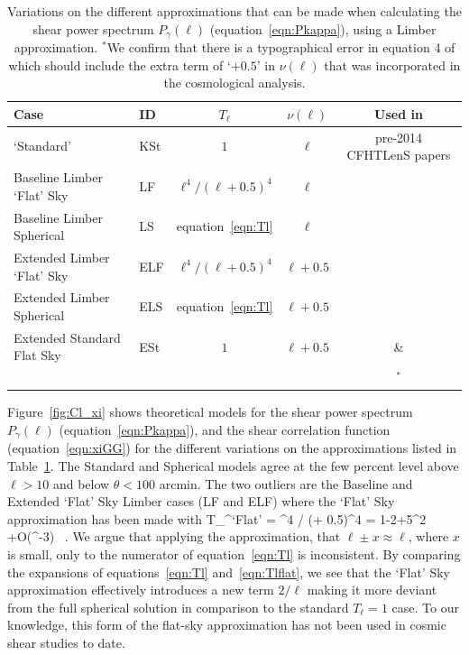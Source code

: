 \begin{table}[htb]
\begin{center}
\begin{tabular}{ | l | l | c | c  | c |}
\hline
Case & ID & $T_\ell$ & $\nu(\ell)$ & Used in \\ \hline
\citet{kitching/etal:2016} `Standard' & KSt & $1$ & $\ell$ & pre-2014 CFHTLenS papers \\
Baseline Limber `Flat' Sky &  LF & $\ell^4 / (\ell + 0.5)^4$ & $\ell$ & \\
Baseline Limber Spherical & LS & equation~\ref{eqn:Tl} & $\ell$ & \\
Extended Limber `Flat' Sky & ELF & $\ell^4 / (\ell + 0.5)^4$ & $\ell + 0.5$ & \\
Extended Limber Spherical & ELS & equation~\ref{eqn:Tl}& $\ell + 0.5$  & \\
Extended Standard Flat Sky & ESt & $1$ & $\ell + 0.5$ & \citet{joudaki/etal:2016} \&  \\
  &  & & & \citet{hildebrandt/etal:2016}$^*$\\\hline
 \end{tabular}
 \end{center}
 \caption{\label{tab:Tl_nu}Variations on the different approximations that can be made when calculating the shear power spectrum $P_\gamma(\ell)$ (equation~\ref{eqn:Pkappa}), using a Limber approximation.  $^*$We confirm that there is a typographical error in equation 4 of \citet{hildebrandt/etal:2016} which should include the extra term of `$+0.5$' in $\nu(\ell)$ that was incorporated in the cosmological analysis.} 
 \end{table}

Figure~\ref{fig:Cl_xi} shows theoretical models for the shear power spectrum $P_\gamma(\ell)$ (equation~\ref{eqn:Pkappa}), and the shear correlation function (equation~\ref{eqn:xiGG}) for the different variations on the approximations listed in Table~\ref{tab:Tl_nu}.   The Standard and Spherical models agree at the few percent level above $\ell>10$ and below $\theta< 100$ arcmin.  The two outliers are the Baseline and Extended `Flat' Sky Limber cases (LF and ELF) where the \citet{kitching/etal:2016} `Flat' Sky approximation has been made with
\be
T_\ell^{\rm `Flat'} = \ell^4 / (\ell + 0.5)^4 = 1-{2\over \ell}+{5\ell^2} +{\cal O}(\ell^{-3}) \, . 
\ee    
We argue that applying the approximation, that $\ell \pm x \approx \ell$, where $x$ is small, only to the numerator of equation~\ref{eqn:Tl} is inconsistent.  By comparing the expansions of equations~\ref{eqn:Tl} and~\ref{eqn:Tlflat}, we see that the \citet{kitching/etal:2016} `Flat' Sky approximation effectively introduces a new term $2/\ell$ making it more deviant from the full spherical solution in comparison to the standard $T_\ell = 1$ case.    To our knowledge, this form of the flat-sky approximation has not been used in cosmic shear studies to date.  

